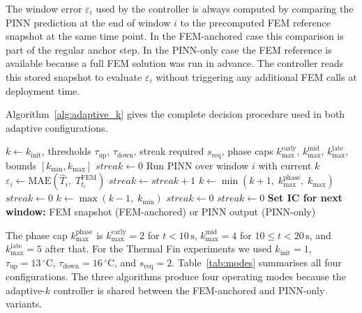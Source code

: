 The window error $\varepsilon_i$ used by the controller is always computed by
comparing the PINN prediction at the end of window $i$ to the precomputed FEM
reference snapshot at the same time point.
In the FEM-anchored case this comparison is part of the regular anchor step.
In the PINN-only case the FEM reference is available because a full FEM
solution was run in advance.
The controller reads this stored snapshot to evaluate $\varepsilon_i$ without
triggering any additional FEM calls at deployment time.

Algorithm~\ref{alg:adaptive_k} gives the complete decision procedure used
in both adaptive configurations.

\begin{algorithm}[H]
\caption{Adaptive $k$ controller (used for FEM-anchored adaptive and
PINN-only adaptive modes)}
\label{alg:adaptive_k}
\begin{algorithmic}[1]
\Require $k \leftarrow k_\mathrm{init}$,\;
         thresholds $\tau_\mathrm{up}$, $\tau_\mathrm{down}$,\;
         streak required $s_\mathrm{req}$,\;
         phase caps $k_\mathrm{max}^\mathrm{early}$,\;
         $k_\mathrm{max}^\mathrm{mid}$,\;
         $k_\mathrm{max}^\mathrm{late}$,\;
         bounds $[k_\mathrm{min}, k_\mathrm{max}]$
\State $\mathit{streak} \leftarrow 0$
    \State Run PINN over window $i$ with current $k$
    \State $\varepsilon_i \leftarrow \mathrm{MAE}(\hat{T}_i,\; T^\mathrm{FEM}_{t_i})$
        \State $\mathit{streak} \leftarrow \mathit{streak} + 1$
            \State $k \leftarrow \min(k+1,\;k_\mathrm{max}^\mathrm{phase},\;k_\mathrm{max})$
            \State $\mathit{streak} \leftarrow 0$
        \EndIf
        \State $k \leftarrow \max(k-1,\;k_\mathrm{min})$
        \State $\mathit{streak} \leftarrow 0$
    \Else
        \State $\mathit{streak} \leftarrow 0$
    \EndIf
    \State \textbf{Set IC for next window:} FEM snapshot (FEM-anchored) or
    \Statex \hspace{4.8em} PINN output (PINN-only)
\EndFor
\end{algorithmic}
\end{algorithm}

The phase cap $k_\mathrm{max}^\mathrm{phase}$ is
$k_\mathrm{max}^\mathrm{early}=2$ for $t<10\,\mathrm{s}$,
$k_\mathrm{max}^\mathrm{mid}=4$ for $10\leq t<20\,\mathrm{s}$, and
$k_\mathrm{max}^\mathrm{late}=5$ after that.
For the Thermal Fin experiments we used $k_\mathrm{init}=1$,
$\tau_\mathrm{up}=13\,^\circ\mathrm{C}$,
$\tau_\mathrm{down}=16\,^\circ\mathrm{C}$, and $s_\mathrm{req}=2$.
Table~\ref{tab:modes} summarises all four configurations.
The three algorithms produce four operating modes because the adaptive-$k$
controller is shared between the FEM-anchored and PINN-only variants.

